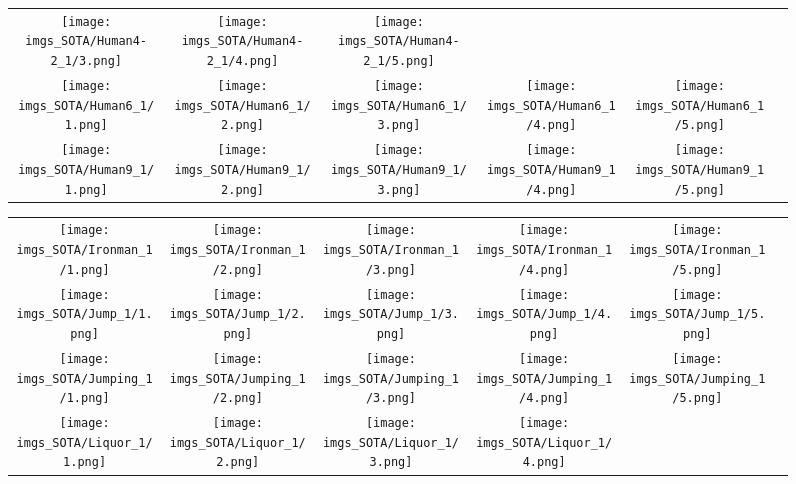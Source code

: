 \begin{figure}[H]
\begin{tabular}{@{}c@{}c@{}c@{}c@{}c@{}c@{}}
\texttt{[image: imgs\_SOTA/Human4-2\_1/3.png]}&
\texttt{[image: imgs\_SOTA/Human4-2\_1/4.png]}&
\texttt{[image: imgs\_SOTA/Human4-2\_1/5.png]}&
\\
\texttt{[image: imgs\_SOTA/Human6\_1/1.png]}&
\texttt{[image: imgs\_SOTA/Human6\_1/2.png]}&
\texttt{[image: imgs\_SOTA/Human6\_1/3.png]}&
\texttt{[image: imgs\_SOTA/Human6\_1/4.png]}&
\texttt{[image: imgs\_SOTA/Human6\_1/5.png]}&
\\
\texttt{[image: imgs\_SOTA/Human9\_1/1.png]}&
\texttt{[image: imgs\_SOTA/Human9\_1/2.png]}&
\texttt{[image: imgs\_SOTA/Human9\_1/3.png]}&
\texttt{[image: imgs\_SOTA/Human9\_1/4.png]}&
\texttt{[image: imgs\_SOTA/Human9\_1/5.png]}&
\\
\end{tabular}\end{figure}\begin{figure}[H]
\setlength{\tabcolsep}{6pt}
\renewcommand{\arraystretch}{0}
\begin{tabular}{@{}c@{}c@{}c@{}c@{}c@{}c@{}}\texttt{[image: imgs\_SOTA/Ironman\_1/1.png]}&
\texttt{[image: imgs\_SOTA/Ironman\_1/2.png]}&
\texttt{[image: imgs\_SOTA/Ironman\_1/3.png]}&
\texttt{[image: imgs\_SOTA/Ironman\_1/4.png]}&
\texttt{[image: imgs\_SOTA/Ironman\_1/5.png]}&
\\
\texttt{[image: imgs\_SOTA/Jump\_1/1.png]}&
\texttt{[image: imgs\_SOTA/Jump\_1/2.png]}&
\texttt{[image: imgs\_SOTA/Jump\_1/3.png]}&
\texttt{[image: imgs\_SOTA/Jump\_1/4.png]}&
\texttt{[image: imgs\_SOTA/Jump\_1/5.png]}&
\\
\texttt{[image: imgs\_SOTA/Jumping\_1/1.png]}&
\texttt{[image: imgs\_SOTA/Jumping\_1/2.png]}&
\texttt{[image: imgs\_SOTA/Jumping\_1/3.png]}&
\texttt{[image: imgs\_SOTA/Jumping\_1/4.png]}&
\texttt{[image: imgs\_SOTA/Jumping\_1/5.png]}&
\\
\texttt{[image: imgs\_SOTA/Liquor\_1/1.png]}&
\texttt{[image: imgs\_SOTA/Liquor\_1/2.png]}&
\texttt{[image: imgs\_SOTA/Liquor\_1/3.png]}&
\texttt{[image: imgs\_SOTA/Liquor\_1/4.png]}&

\end{tabular}
\end{figure}
